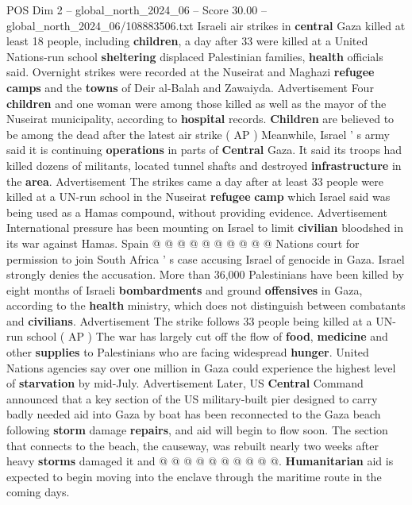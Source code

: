 \begin{textsample}{POS Dim 2 – global\_north\_2024\_06 – Score 30.00 – global\_north\_2024\_06/108883506.txt}  \label{ex:f2_pos_255}
Israeli air strikes in \textbf{central} Gaza killed at least 18 people, including \textbf{children}, a day after 33 were killed at a United Nations-run school \textbf{sheltering} displaced Palestinian families, \textbf{health} officials said.
Overnight strikes were recorded at the Nuseirat and Maghazi \textbf{refugee} \textbf{camps} and the \textbf{towns} of Deir al-Balah and Zawaiyda.
Advertisement Four \textbf{children} and one woman were among those killed as well as the mayor of the Nuseirat municipality, according to \textbf{hospital} records. \textbf{Children} are believed to be among the dead after the latest air strike ( AP ) Meanwhile, Israel ' s army said it is continuing \textbf{operations} in parts of \textbf{Central} Gaza.
It said its troops had killed dozens of militants, located tunnel shafts and destroyed \textbf{infrastructure} in the \textbf{area}.
Advertisement The strikes came a day after at least 33 people were killed at a UN-run school in the Nuseirat \textbf{refugee} \textbf{camp} which Israel said was being used as a Hamas compound, without providing evidence.
Advertisement International pressure has been mounting on Israel to limit \textbf{civilian} bloodshed in its war against Hamas.
Spain @ @ @ @ @ @ @ @ @ @ Nations court for permission to join South Africa ' s case accusing Israel of genocide in Gaza.
Israel strongly denies the accusation.
More than 36,000 Palestinians have been killed by eight months of Israeli \textbf{bombardments} and ground \textbf{offensives} in Gaza, according to the \textbf{health} ministry, which does not distinguish between combatants and \textbf{civilians}.
Advertisement The strike follows 33 people being killed at a UN-run school ( AP ) The war has largely cut off the flow of \textbf{food}, \textbf{medicine} and other \textbf{supplies} to Palestinians who are facing widespread \textbf{hunger}.
United Nations agencies say over one million in Gaza could experience the highest level of \textbf{starvation} by mid-July.
Advertisement Later, US \textbf{Central} Command announced that a key section of the US military-built pier designed to carry badly needed aid into Gaza by boat has been reconnected to the Gaza beach following \textbf{storm} damage \textbf{repairs}, and aid will begin to flow soon.
The section that connects to the beach, the causeway, was rebuilt nearly two weeks after heavy \textbf{storms} damaged it and @ @ @ @ @ @ @ @ @ @. \textbf{Humanitarian} aid is expected to begin moving into the enclave through the maritime route in the coming days.

\end{textsample}

